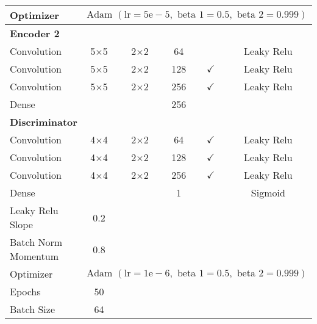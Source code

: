 \begin{longtable}[c]{@{}lccccc@{}}
	Optimizer & \multicolumn{5}{l}{$\text { Adam }(\mathrm{lr}=5 \mathrm{e}-5, \text { beta } 1=0.5, \text { beta } 2=0.999)$} \\ \hline
	\multicolumn{6}{l}{\textbf{Encoder 2}} \\
	Convolution & \multicolumn{1}{c}{5$\times$5} & 2$\times$2 & 64 &  & Leaky Relu \\
	Convolution & \multicolumn{1}{c}{5$\times$5} & 2$\times$2 & 128 & $\checkmark$ & Leaky Relu \\
	Convolution & \multicolumn{1}{c}{5$\times$5} & 2$\times$2 & 256 & $\checkmark$ & Leaky Relu \\
	Dense & \multicolumn{1}{c}{} &  & 256 &  &  \\ 
	\multicolumn{6}{l}{\textbf{Discriminator}} \\
	Convolution & \multicolumn{1}{c}{4$\times$4} & 2$\times$2 & 64 & $\checkmark$ & Leaky Relu \\
	Convolution & \multicolumn{1}{c}{4$\times$4} & 2$\times$2 & 128 & $\checkmark$ & Leaky Relu \\
	Convolution & \multicolumn{1}{c}{4$\times$4} & 2$\times$2 & 256 & $\checkmark$ & Leaky Relu \\
	Dense & \multicolumn{1}{c}{} &  & 1 &  & Sigmoid \\ \hline
	Leaky Relu Slope & 0.2 & \multicolumn{1}{l}{} & \multicolumn{1}{l}{} & \multicolumn{1}{l}{} & \multicolumn{1}{l}{} \\
	Batch Norm Momentum & 0.8 & \multicolumn{1}{l}{} & \multicolumn{1}{l}{} & \multicolumn{1}{l}{} & \multicolumn{1}{l}{} \\
	Optimizer & \multicolumn{5}{l}{$\text { Adam }(\mathrm{lr}=1 \mathrm{e}-6, \text { beta } 1=0.5, \text { beta } 2=0.999)$} \\ \hline
	Epochs & 50 & \multicolumn{1}{l}{} & \multicolumn{1}{l}{} & \multicolumn{1}{l}{} & \multicolumn{1}{l}{} \\
	Batch Size & 64 & \multicolumn{1}{l}{} & \multicolumn{1}{l}{} & \multicolumn{1}{l}{} & \multicolumn{1}{l}{} \\ \hline
\end{longtable}



